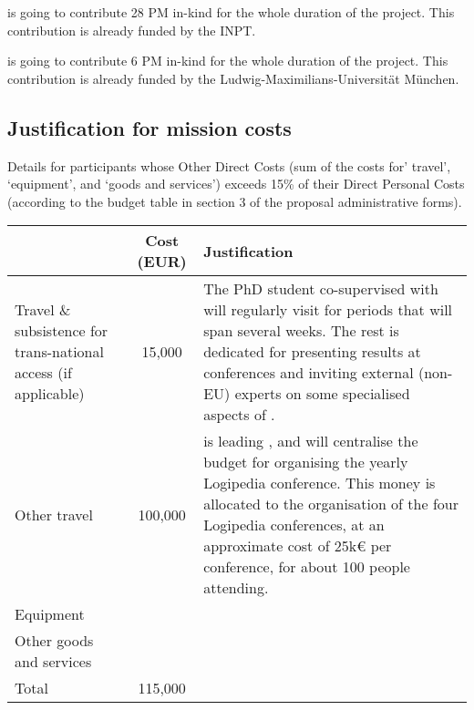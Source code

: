  is going to contribute 28 PM in-kind for the whole duration of the project.
This contribution is already funded by the INPT.

 is going to contribute 6 PM in-kind for the whole duration of the project.
This contribution is already funded by the Ludwig-Maximilians-Universit\"at M\"unchen.

\subsection*{Justification for mission costs}

Details for participants whose Other Direct Costs (sum of the costs
for’ travel’, ‘equipment’, and ‘goods and services’) exceeds 15\% of
their Direct Personal Costs (according to the budget table in section
3 of the proposal administrative forms).

\begin{longtable*}{|p{.25\textwidth}|c|p{0.55\textwidth}|}
\hline
   & Cost (EUR)  & Justification \\
  \hline
  Travel \& subsistence for trans-national access (if applicable) & 15,000 &

  The PhD student co-supervised with  will regularly visit
   for periods that will span several weeks.
  The rest is dedicated for
  presenting results at conferences and inviting external (non-EU) experts
  on some specialised aspects of .\\
  \hline
  Other travel & 100,000 &
   is leading , and will centralise the
  budget for organising the yearly Logipedia conference. This money is
  allocated to the organisation of the four Logipedia conferences, at an
  approximate cost of 25k€ per conference, for about 100 people attending.
   \\
  \hline
  Equipment & & \\
  \hline
  Other goods and services & & \\
  \hline
  Total & 115,000 & \\
  \hline
\end{longtable*}

